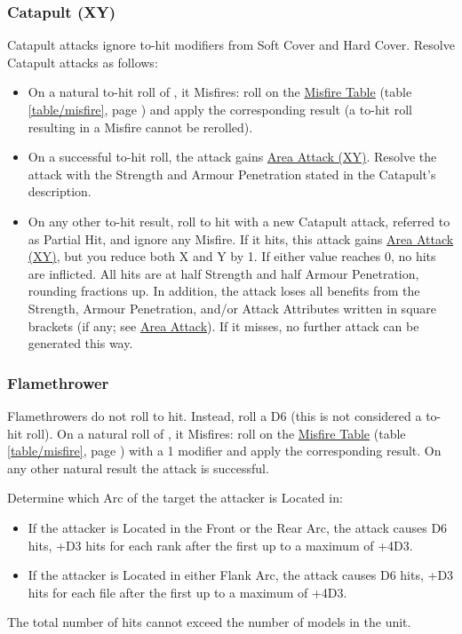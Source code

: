 \subsubsection{Catapult (X\timess{}Y)}
\idx[main=y]{\catapult{}}\label{catapult}

Catapult attacks ignore to-hit modifiers from Soft Cover and Hard Cover. Resolve Catapult attacks as follows:

\begin{itemize}
	\item On a natural to-hit roll of , it Misfires: roll on the \hyperref[the_misfire_table]{Misfire Table} (table \ref{table/misfire}, page \pageref{table/misfire}) and apply the corresponding result (a to-hit roll resulting in a Misfire cannot be rerolled).
	\item On a successful to-hit roll, the attack gains \hyperref[area_attack]{Area Attack (X\timess{}Y)}. Resolve the attack with the Strength and Armour Penetration stated in the Catapult's description.
	\item On any other to-hit result, roll to hit with a new Catapult attack, referred to as Partial Hit, and ignore any Misfire. If it hits, this attack gains \hyperref[area_attack]{Area Attack (X\timess{}Y)}, but you reduce both X and Y by 1. If either value reaches 0, no hits are inflicted. All hits are at half Strength and half Armour Penetration, rounding fractions up. In addition, the attack loses all benefits from the Strength, Armour Penetration, and/or Attack Attributes written in square brackets (if any; see \hyperref[area_attack]{Area Attack}). If it misses, no further attack can be generated this way.
\end{itemize}

\subsubsection{Flamethrower}
\idx[main=y]{\flamethrower}\label{flamethrower}

Flamethrowers do not roll to hit. Instead, roll a D6 (this is not considered a to-hit roll). On a natural roll of , it Misfires: roll on the \hyperref[the_misfire_table]{Misfire Table} (table \ref{table/misfire}, page \pageref{table/misfire}) with a \minuss{}1 modifier and apply the corresponding result. On any other natural result the attack is successful.

Determine which Arc of the target the attacker is Located in:
\begin{itemize}
	\item If the attacker is Located in the Front or the Rear Arc, the attack causes D6 hits, +D3 hits for each rank after the first up to a maximum of +4D3.
	\item If the attacker is Located in either Flank Arc, the attack causes D6 hits, +D3 hits for each file after the first up to a maximum of +4D3.
\end{itemize}
The total number of hits cannot exceed the number of models in the unit.

